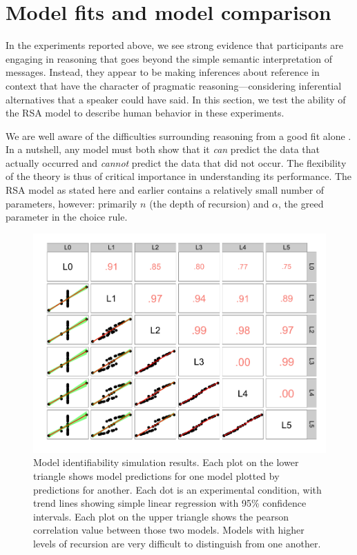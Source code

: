 \section{Model fits and model comparison}
\label{sec:models}

In the experiments reported above, we see strong evidence that participants are engaging in reasoning that goes beyond the simple semantic interpretation of messages. Instead, they appear to be making inferences about reference in context that have the character of pragmatic reasoning---considering inferential alternatives that a speaker could have said. In this section, we test the ability of the RSA model to describe human behavior in these experiments. 

We are well aware of the difficulties surrounding reasoning from a good fit alone \cite{roberts2000}. In a nutshell, any model must both show that it \emph{can} predict the data that actually occurred and \emph{cannot} predict the data that did not occur. The flexibility of the theory is thus of critical importance in understanding its performance. The RSA model as stated here and earlier contains a relatively small number of parameters, however: primarily $n$ (the depth of recursion) and $\alpha$, the greed parameter in the choice rule. 

 \begin{figure}[t]
  \centering
  \includegraphics[width=6in]{../plots/models-2.pdf}
  \caption{\label{fig:models-2} Model identifiability simulation results. Each plot on the lower triangle shows model predictions for one model plotted by predictions for another. Each dot is an experimental condition, with trend lines showing simple linear regression with 95\% confidence intervals. Each plot on the upper triangle shows the pearson correlation value between those two models. Models with higher levels of recursion are very difficult to distinguish from one another.}
\end{figure}


